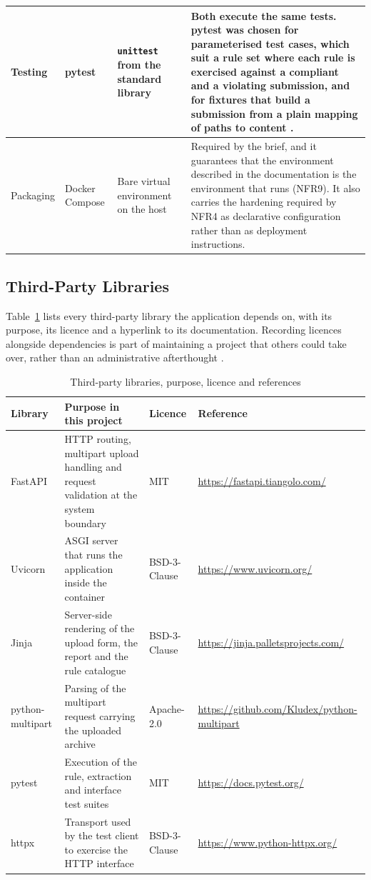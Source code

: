 \documentclass[a4paper,11pt]{article}
\begin{document}
\begin{table}[H]
\begin{tabularx}{\textwidth}{|p{2.3cm}|p{2.2cm}|p{2.9cm}|X|}
\hline
Testing & pytest \citep{Pytest2025} & \texttt{unittest} from the standard library & Both execute the same tests. pytest was chosen for parameterised test cases, which suit a rule set where each rule is exercised against a compliant and a violating submission, and for fixtures that build a submission from a plain mapping of paths to content \citep{Khorikov2020}. \\
\hline
Packaging & Docker Compose \citep{Docker2024} & Bare virtual environment on the host & Required by the brief, and it guarantees that the environment described in the documentation is the environment that runs (NFR9). It also carries the hardening required by NFR4 as declarative configuration rather than as deployment instructions. \\
\hline
\end{tabularx}
\end{table}

\subsection{Third-Party Libraries}\label{subsec:libraries}

Table~\ref{tab:libraries} lists every third-party library the application
depends on, with its purpose, its licence and a hyperlink to its documentation.
Recording licences alongside dependencies is part of maintaining a project that
others could take over, rather than an administrative afterthought
\citep{Winters2020}.

\begin{table}[H]
\centering
\caption{Third-party libraries, purpose, licence and references}
\label{tab:libraries}
\footnotesize
\renewcommand{\arraystretch}{1.2}
\setlength{\tabcolsep}{4pt}
\begin{tabularx}{\textwidth}{|p{2.3cm}|X|p{1.9cm}|p{3.4cm}|}
\hline
\rowcolor{gray!15}
\textbf{Library} & \textbf{Purpose in this project} & \textbf{Licence} & \textbf{Reference} \\
\hline
\hline
FastAPI & HTTP routing, multipart upload handling and request validation at the system boundary & MIT & \url{https://fastapi.tiangolo.com/} \\
\hline
Uvicorn & ASGI server that runs the application inside the container & BSD-3-Clause & \url{https://www.uvicorn.org/} \\
\hline
Jinja & Server-side rendering of the upload form, the report and the rule catalogue & BSD-3-Clause & \url{https://jinja.palletsprojects.com/} \\
\hline
python-multipart & Parsing of the multipart request carrying the uploaded archive & Apache-2.0 & \url{https://github.com/Kludex/python-multipart} \\
\hline
pytest & Execution of the rule, extraction and interface test suites & MIT & \url{https://docs.pytest.org/} \\
\hline
httpx & Transport used by the test client to exercise the HTTP interface & BSD-3-Clause & \url{https://www.python-httpx.org/} \\
\hline
\end{tabularx}
\end{table}
\end{document}
